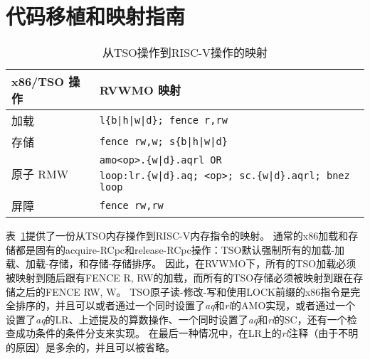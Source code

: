 \section{代码移植和映射指南}
\label{sec:memory:porting}

\begin{table}[h!]
  \centering
  \begin{tabular}{|l|l|}
    \hline
    x86/TSO 操作 & RVWMO 映射 \\
    \hline
    \hline
    加载             & \tt l\{b|h|w|d\}; fence r,rw               \\
    \hline
    存储             & \tt fence rw,w; s\{b|h|w|d\}               \\
    \hline
    \multirow{2}{*}{原子 RMW}
    & \tt amo<op>.\{w|d\}.aqrl \textrm{OR} \\
    & \tt loop:\@ lr.\{w|d\}.aq; <op>; sc.\{w|d\}.aqrl; bnez loop \\
    \hline
    屏障             & \tt fence rw,rw \\
    \hline
  \end{tabular}
  \caption{从TSO操作到RISC-V操作的映射  
  }
  \label{tab:tsomappings}
\end{table}

表~\ref{tab:tsomappings}提供了一份从TSO内存操作到RISC-V内存指令的映射。
通常的x86加载和存储都是固有的acquire-RCpc和release-RCpc操作：TSO默认强制所有的加载-加载、加载-存储，和存储-存储排序。
因此，在RVWMO下，所有的TSO加载必须被映射到随后跟有FENCE R, RW的加载，而所有的TSO存储必须被映射到跟在存储之后的FENCE RW, W。
TSO原子读-修改-写和使用LOCK前缀的x86指令是完全排序的，并且可以或者通过一个同时设置了{\em aq}和{\em rl}的AMO实现，或者通过一个设置了{\em aq}的LR、上述提及的算数操作、一个同时设置了{\em aq}和{\em rl}的SC，还有一个检查成功条件的条件分支来实现。
在最后一种情况中，在LR上的{\em rl}注释（由于不明的原因）是多余的，并且可以被省略。

